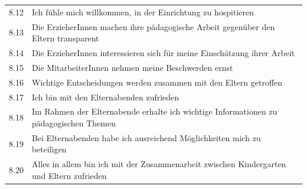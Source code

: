 \documentclass[12pt,a4paper]{article}
\begin{document}
\begin{appendix}
\begin{table}[h]
\begin{tabularx}{\textwidth}{rX}
8.12& Ich fühle mich willkommen, in der Einrichtung zu hospitieren      
\\
8.13& Die ErzieherInnen machen ihre pädagogische Arbeit gegenüber
        den Eltern transparent                                                                                                                                                                                                                                            \\
8.14& Die ErzieherInnen interessieren sich für meine Einschätzung
        ihrer Arbeit  
\\
8.15& Die MitarbeiterInnen nehmen meine Beschwerden ernst                                                                                                        \\
8.16& Wichtige Entscheidungen werden zusammen mit den Eltern
        getroffen                                                                                                \\
8.17& Ich bin mit den Elternabenden zufrieden                                              \\
8.18& Im Rahmen der Elternabende erhalte ich wichtige    
        Informationen zu pädagogischen Themen                                                                    \\
8.19& Bei Elternabenden habe ich ausreichend Möglichkeiten mich    
        zu beteiligen                                                                                 \\
8.20& Alles in allem bin ich mit der Zusammenarbeit zwischen  
        Kindergarten und Eltern zufrieden
 \\
\hline 
\end{tabularx} 
\end{table}




\end{appendix}
  
\end{document}
